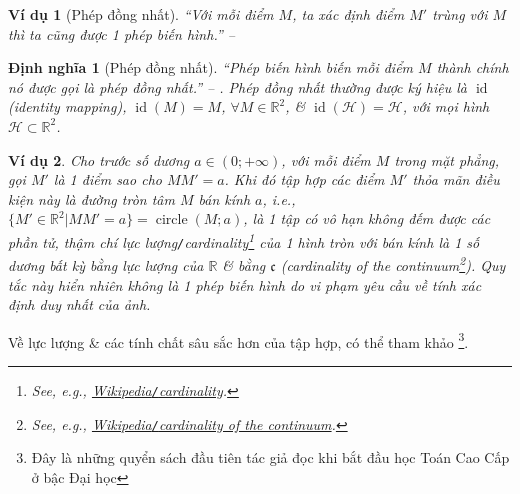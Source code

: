 \documentclass[oneside]{book}
\numberwithin{equation}{section}
\newtheorem{dinhnghia}{Định nghĩa}[section]
\newtheorem{vidu}{Ví dụ}[section]
\begin{document}
\begin{vidu}[Phép đồng nhất]
	``Với mỗi điểm $M$, ta xác định điểm $M'$ trùng với $M$ thì ta cũng được 1 phép biến hình.'' -- \cite[p. 5]{SGK_Toan_11_hinh_hoc_nang_cao}
\end{vidu}

\begin{dinhnghia}[Phép đồng nhất]
	``Phép biến hình biến mỗi điểm $M$ thành chính nó được gọi là \emph{phép đồng nhất}.'' -- \cite[p. 4]{SGK_Toan_11_hinh_hoc_co_ban}. Phép đồng nhất thường được ký hiệu là $\operatorname{id}$ (identity mapping), $\operatorname{id}(M) = M$, $\forall M\in\mathbb{R}^2$, \& $\operatorname{id}(\mathcal{H}) = \mathcal{H}$, với mọi hình $\mathcal{H}\subset\mathbb{R}^2$.
\end{dinhnghia}

\begin{vidu}
	Cho trước số dương $a\in(0;+\infty)$, với mỗi điểm $M$ trong mặt phẳng, gọi $M'$ là 1 điểm sao cho $MM' = a$. Khi đó tập hợp các điểm $M'$ thỏa mãn điều kiện này là đường tròn tâm $M$ bán kính $a$, i.e., $\{M'\in\mathbb{R}^2|MM' = a\} = \operatorname{circle}(M;a)$, là 1 tập có vô hạn không đếm được các phần tử, thậm chí lực lượng\emph{\texttt{/}}cardinality\footnote{See, e.g., \href{https://en.wikipedia.org/wiki/Cardinality}{Wikipedia\texttt{/}cardinality}.} của 1 hình tròn với bán kính là 1 số dương bất kỳ bằng lực lượng của $\mathbb{R}$ \& bằng $\mathfrak{c}$ (cardinality of the continuum\footnote{See, e.g., \href{https://en.wikipedia.org/wiki/Cardinality_of_the_continuum}{Wikipedia\texttt{/}cardinality of the continuum}.}). Quy tắc này hiển nhiên không là 1 phép biến hình do vi phạm yêu cầu về tính xác định duy nhất của ảnh.
\end{vidu}
Về lực lượng \& các tính chất sâu sắc hơn của tập hợp, có thể tham khảo \cite{Halmos1960, Halmos1974, Kaplansky1972, Kaplansky1977}\footnote{Đây là những quyển sách đầu tiên tác giả đọc khi bắt đầu học Toán Cao Cấp ở bậc Đại học}.
\end{document}

